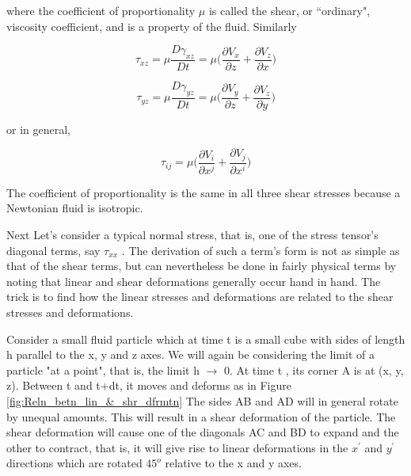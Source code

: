 \documentclass{article}
\begin{document}
{where the coefficient of proportionality $\mu$ is called the shear, or ``ordinary", viscosity
coefficient, and is a property of the fluid. Similarly

\begin{equation} \label{16b}
\tau_{xz} = \mu \frac{D\gamma_{xz}}{Dt} = \mu \bigg(\frac{\partial V_{x}}{\partial z} + \frac{\partial V_{z}}{\partial x}\bigg) \tag{16b}
\end{equation}

\begin{equation} \label{16c}
\tau_{yz} = \mu \frac{D\gamma_{yz}}{Dt} = \mu \bigg(\frac{\partial V_{y}}{\partial z} + \frac{\partial V_{z}}{\partial y}\bigg) \tag{16c}
\end{equation}

or in general,

\begin{equation}
\tau_{ij} = \mu\bigg(\frac{\partial V_{i}}{\partial x^{j}} + \frac{\partial V_{j}}{\partial x^{i}}\bigg)
\end{equation}

The coefficient of proportionality is the same in all three shear stresses because a
Newtonian fluid is isotropic.

Next Let's consider a typical normal stress, that is, one of the stress tensor's diagonal
terms, say $\tau_{xx}$ . The derivation of such a term's form is not as simple as that of the shear terms, but can nevertheless be done in fairly physical terms by noting that linear and shear deformations generally occur hand in hand. The trick is to find how the linear stresses and deformations are related to the shear stresses and deformations.


Consider a small fluid particle which at time t is a small cube with sides of length h
parallel to the x, y and z axes. We will again be considering the limit of a particle "at a
point", that is, the limit h $\to$ 0. At time t , its corner A is at (x, y, z). Between t and t+dt, it moves and deforms as in Figure \ref{fig:Reln_betn_lin_&_shr_dfrmtn} The sides AB and AD will in general rotate by unequal
amounts. This will result in a shear deformation of the particle. The shear deformation will
cause one of the diagonals AC and BD to expand and the other to contract, that is, it will 
give rise to linear deformations in the $x^{'}$ and $y^{'}$ directions which are rotated $45^{o}$ relative to the x and y axes. 

}
\end{document}
